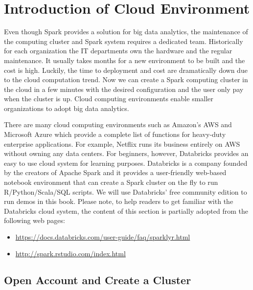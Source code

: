 \documentclass[12pt,]{krantz}
\providecommand{\tightlist}{%
  \setlength{\itemsep}{0pt}\setlength{\parskip}{0pt}}
\begin{document}
\hypertarget{CloudEnvironment}{%
\section{Introduction of Cloud Environment}\label{CloudEnvironment}}

Even though Spark provides a solution for big data analytics, the maintenance of the computing cluster and Spark system requires a dedicated team. Historically for each organization the IT departments own the hardware and the regular maintenance. It usually takes months for a new environment to be built and the cost is high. Luckily, the time to deployment and cost are dramatically down due to the cloud computation trend. Now we can create a Spark computing cluster in the cloud in a few minutes with the desired configuration and the user only pay when the cluster is up. Cloud computing environments enable smaller organizations to adopt big data analytics.

There are many cloud computing environments such as Amazon's AWS and Microsoft Azure which provide a complete list of functions for heavy-duty enterprise applications. For example, Netflix runs its business entirely on AWS without owning any data centers. For beginners, however, Databricks provides an easy to use cloud system for learning purposes. Databricks is a company founded by the creators of Apache Spark and it provides a user-friendly web-based notebook environment that can create a Spark cluster on the fly to run R/Python/Scala/SQL scripts. We will use Databricks' free community edition to run demos in this book. Please note, to help readers to get familiar with the Databricks cloud system, the content of this section is partially adopted from the following web pages:

\begin{itemize}
\tightlist
\item
  \url{https://docs.databricks.com/user-guide/faq/sparklyr.html}
\item
  \url{http://spark.rstudio.com/index.html}
\end{itemize}

\hypertarget{open-account-and-create-a-cluster}{%
\subsection{Open Account and Create a Cluster}\label{open-account-and-create-a-cluster}}
\end{document}

